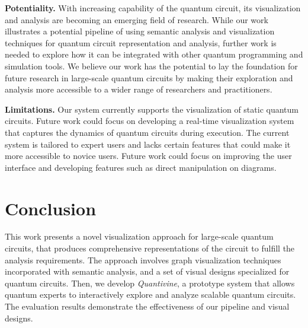 \textbf{Potentiality.}
With increasing capability of the quantum circuit, its visualization and analysis are becoming an emerging field of research.
While our work illustrates a potential pipeline of using semantic analysis and visualization techniques for quantum circuit representation and analysis,
further work is needed to explore how it can be integrated with other quantum programming and simulation tools.
We believe our work has the potential to lay the foundation for future research in large-scale quantum circuits by making their exploration and analysis more accessible to a wider range of researchers and practitioners.

\textbf{Limitations.}
Our system currently supports the visualization of static quantum circuits. 
Future work could focus on developing a real-time visualization system that captures the dynamics of quantum circuits during execution.
The current system is tailored to expert users and lacks certain features that could make it more accessible to novice users.
Future work could focus on improving the user interface and developing features such as direct manipulation on diagrams.

\section{Conclusion}
This work presents a novel visualization approach for large-scale quantum circuits, that produces comprehensive representations of the circuit to fulfill the analysis requirements.
The approach involves graph visualization techniques incorporated with semantic analysis, and a set of visual designs specialized for quantum circuits. 
Then, we develop \emph{Quantivine}, a prototype system that allows quantum experts to interactively explore and analyze scalable quantum circuits.
The evaluation results demonstrate the effectiveness of our pipeline and visual designs.

